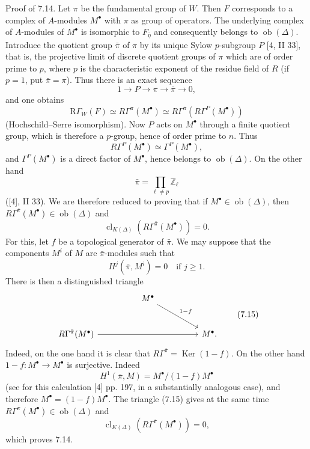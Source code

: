 \documentclass[11pt]{article}
\providecommand{\Ker}{\operatorname{Ker}}
\providecommand{\Ob}{\operatorname{ob}}
\providecommand{\Ker}{\operatorname{Ker}}
\providecommand{\Ker}{\operatorname{Ker}}
\providecommand{\Ob}{\operatorname{ob}}
\providecommand{\Ob}{\operatorname{Ob}}
\providecommand{\clK}[1]{\operatorname{cl}_{K(#1)}}
\providecommand{\RG}{\mathrm R\Gamma}
\providecommand{\Ob}{\operatorname{ob}}
\begin{document}
Proof of 7.14. Let $\pi$ be the fundamental group of $W$. Then $F$ corresponds to a complex of $A$-modules $M^\bullet$ with $\pi$ as group of operators. The underlying complex of $A$-modules of $M^\bullet$ is isomorphic to $F_{\bar\eta}$ and consequently belongs to $\Ob(\Delta)$. Introduce the quotient group $\bar\pi$ of $\pi$ by its unique Sylow $p$-subgroup $P$ [4, II 33], that is, the projective limit of discrete quotient groups of $\pi$ which are of order prime to $p$, where $p$ is the characteristic exponent of the residue field of $R$ (if $p=1$, put $\bar\pi=\pi$). Thus there is an exact sequence
\[
1\longrightarrow P\longrightarrow \pi\longrightarrow \bar\pi\longrightarrow0,
\]
and one obtains
\[
\RG_W(F)\simeq R\Gamma^\pi(M^\bullet)
\simeq R\Gamma^{\bar\pi}(R\Gamma^P(M^\bullet))
\]
(Hochschild--Serre isomorphism). Now $P$ acts on $M^\bullet$ through a finite quotient group, which is therefore a $p$-group, hence of order prime to $n$. Thus
\[
R\Gamma^P(M^\bullet)\simeq \Gamma^P(M^\bullet),
\]
and $\Gamma^P(M^\bullet)$ is a direct factor of $M^\bullet$, hence belongs to $\Ob(\Delta)$. On the other hand
\[
\bar\pi=\prod_{\ell\ne p}\mathbb Z_\ell
\]
([4], II 33). We are therefore reduced to proving that if $M^\bullet\in\Ob(\Delta)$, then $R\Gamma^{\bar\pi}(M^\bullet)\in\Ob(\Delta)$ and
\[
\clK{\Delta}(R\Gamma^{\bar\pi}(M^\bullet))=0.
\]
For this, let $f$ be a topological generator of $\bar\pi$. We may suppose that the components $M^i$ of $M$ are $\bar\pi$-modules such that
\[
H^j(\bar\pi,M^i)=0\quad\text{if }j\ge1.
\]
There is then a distinguished triangle
\[
\begin{tikzcd}[column sep=huge,row sep=large]
& M^\bullet \arrow[dr,"1-f"] &\\
R\Gamma^{\bar\pi}(M^\bullet) \arrow[rr] && M^\bullet .
\end{tikzcd}
\tag{7.15}
\]
Indeed, on the one hand it is clear that $R\Gamma^{\bar\pi}=\Ker(1-f)$. On the other hand $1-f:M^\bullet\to M^\bullet$ is surjective. Indeed
\[
H^1(\bar\pi,M)=M^\bullet/(1-f)M^\bullet
\]
(see for this calculation [4] pp. 197, in a substantially analogous case), and therefore $M^\bullet=(1-f)M^\bullet$. The triangle (7.15) gives at the same time $R\Gamma^{\bar\pi}(M^\bullet)\in\Ob(\Delta)$ and
\[
\clK{\Delta}(R\Gamma^{\bar\pi}(M^\bullet))=0,
\]
which proves 7.14.
\end{document}
